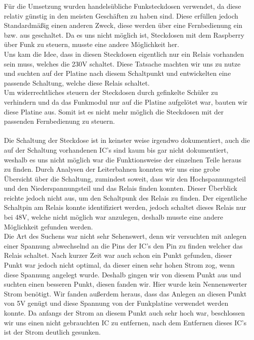 Für die Umsetzung wurden handelsübliche Funksteckdosen verwendet, da diese relativ günstig in den meisten Geschäften zu haben sind. Diese erfüllen jedoch Standardmäßig einen anderen Zweck, diese werden über eine Fernbedienung ein bzw. aus geschaltet. Da es uns nicht möglich ist, Steckdosen mit dem Raspberry über Funk zu steuern, musste eine andere Möglichkeit her.\\
Uns kam die Idee, dass in diesen Steckdosen eigentlich nur ein Relais vorhanden sein muss, welches die 230V schaltet. Diese Tatsache machten wir uns zu nutze und suchten auf der Platine nach diesem Schaltpunkt und entwickelten eine passende Schaltung, welche diese Relais schaltet.\\
Um widerrechtliches steuern der Steckdosen durch gefinkelte Schüler zu verhindern und da das Funkmodul nur auf die Platine aufgelötet war, bauten wir diese Platine aus. Somit ist es nicht mehr möglich die Steckdosen mit der passenden Fernbedienung zu steuern.\\\\
Die Schaltung der Steckdose ist in keinster weise irgendwo dokumentiert, auch die auf der Schaltung vorhandenen IC's sind kaum bis gar nicht dokumentiert, weshalb es uns nicht möglich war die Funktionsweise der einzelnen Teile heraus zu finden. Durch Analysen der Leiterbahnen konnten wir uns eine grobe Übersicht über die Schaltung, zumindest soweit, dass wir den Hochspannungsteil und den Niederspannungsteil und das Relais finden konnten. Dieser Überblick reichte jedoch nicht aus, um den Schaltpunk des Relais zu finden. Der eigentliche Schaltpin am Relais konnte identifiziert werden, jedoch schaltet dieses Relais nur bei 48V, welche nicht möglich war anzulegen, deshalb musste eine andere Möglichkeit gefunden werden.\\ 
Die Art des Suchens war nicht sehr Sehenswert, denn wir versuchten mit anlegen einer Spannung abwechselnd an die Pins der IC's den Pin zu finden welcher das Relais schaltet. Nach kurzer Zeit war auch schon ein Punkt gefunden, dieser Punkt war jedoch nicht optimal, da dieser einen sehr hohen Strom zog, wenn diese Spannung angelegt wurde. Deshalb gingen wir von diesem Punkt aus und suchten einen besseren Punkt, diesen fanden wir. Hier wurde kein Nennenswerter Strom benötigt. Wir fanden außerdem heraus, dass das Anlegen an diesen Punkt von 5V genügt und diese Spannung von der Funkplatine verwendet werden konnte. Da anfangs der Strom an diesem Punkt auch sehr hoch war, beschlossen wir uns einen nicht gebrauchten IC zu entfernen, nach dem Entfernen dieses IC's ist der Strom deutlich gesunken.\\
